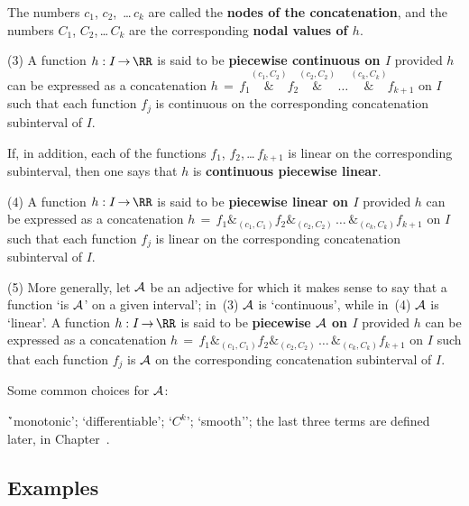 {    The numbers $c_{1}$, $c_{2}$, \,{\ldots}\,$c_{k}$ are called the {\bf nodes of the concatenation},
    and the numbers $C_{1}$, $C_{2}$,\,{\ldots}\,$C_{k}$ are the corresponding {\bf nodal values of $h$}.

\V

        (3) A function $h:I \,{\rightarrow}\, {\RR}$ is said to be {\bf piecewise continuous on $I$} provided $h$ can be expressed as a concatenation
    $h \,=\, f_{1}\stackrel{(c_{1},C_{2})}{\&}f_{2}\stackrel{(c_{2},C_{2})}{\&}\,{\ldots}\,\stackrel{(c_{k},C_{k})}{\&}f_{k+1}$
    on $I$ such that each function $f_{j}$ is continuous on the corresponding concatenation subinterval of $I$.

        If, in addition, each of the functions $f_{1}$, $f_{2}$,\,{\ldots}\,$f_{k+1}$ is linear on the corresponding subinterval, then one says that $h$ is {\bf continuous piecewise linear}.

\V

        (4) A function $h:I \,{\rightarrow}\, {\RR}$ is said to be {\bf piecewise linear on $I$} provided $h$ can be expressed as a concatenation
    $h \,=\, f_{1}\mbox{\&}_{(c_{1},C_{1})}f_{2}\mbox{\&}_{(c_{2},C_{2})}\,{\ldots}\,\mbox{\&}_{(c_{k},C_{k})}f_{k+1}$
    on $I$ such that each function $f_{j}$ is linear on the corresponding concatenation subinterval of $I$.

\V

        (5) More generally, let ${\cal A}$ be an adjective for which it makes sense to say that a function `is ${\cal A}$' on a given interval';
    in~(3) ${\cal A}$ is `continuous', while in~(4) ${\cal A}$ is `linear'.
    A function $h:I \,{\rightarrow}\, {\RR}$ is said to be {\bf piecewise ${\cal A}$ on $I$} provided $h$ can be expressed as a concatenation
    $h \,=\, f_{1}\mbox{\&}_{(c_{1},C_{1})}f_{2}\mbox{\&}_{(c_{2},C_{2})}\,{\ldots}\,\mbox{\&}_{(c_{k},C_{k})}f_{k+1}$
    on $I$ such that each function $f_{j}$ is ${\cal A}$ on the corresponding concatenation subinterval of $I$.

        Some common choices for ${\cal A}$:

        \h `monotonic'; `differentiable'; `$C^{k}$'; `smooth''; the last three terms are defined later, in Chapter~.


\V
\V

            \subsection{\small{\bf Examples}}
            \label{ExampD20.58B}

}
